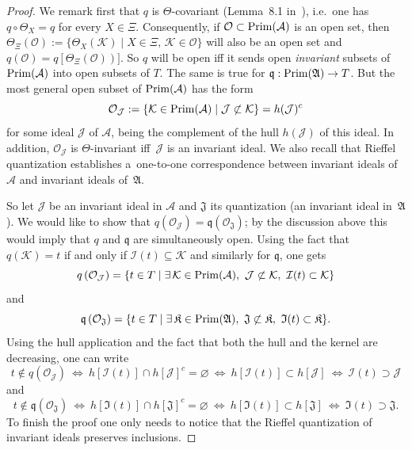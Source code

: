\documentclass[pdftex]{sigma}
\def\A{{\mathcal A}}
\def\Th{\Theta}
\def\AA{\mathfrak A}
\begin{document}
\begin{proof}
We remark f\/irst that $q$ is $\Th$-covariant (Lemma~8.1 in~\cite{Wi}), i.e.\ one has $q\circ\Th_X=q$ for every $X\in\Xi$.
Consequently, if $\mathcal O\subset {\rm Prim}(\A)$ is
an open set, then $\Th_\Xi(\mathcal O):=\{\Th_X(\mathcal K)\mid X\in\Xi, \, \mathcal K\in\mathcal O\}$ will also be an open set
and $q(\mathcal O)=q\left[\Th_\Xi(\mathcal O)\right)]$.
So $q$ will be open if\/f it sends open {\it invariant} subsets of ${\rm Prim}(\A)$
into open subsets of $T$. The same is true for $\mathfrak q:{\rm Prim}(\AA)\rightarrow T$. But the most general
open subset of ${\rm Prim}(\A)$ has the form
\[
\mathcal O_{\mathcal J}:=\{\mathcal K\in {\rm Prim}(\A)\mid \mathcal J\not\subset\mathcal K\}=h(\mathcal J)^c
\]
for some ideal $\mathcal J$ of $\A$, being the complement of the hull  $h(\mathcal J)$ of this ideal.
In addition, $\mathcal O_{\mathcal J}$ is $\Th$-invariant if\/f~$\mathcal J$ is an
invariant ideal. We also recall that Rief\/fel quantization establishes
a~one-to-one correspondence between invariant ideals of $\A$ and invariant ideals of~$\AA$.

So let $\mathcal J$ be an invariant ideal in $\A$ and $\mathfrak J$ its quantization
(an invariant ideal in~$\AA$). We would like to show that
$q\left(\mathcal O_\mathcal J\right)=\mathfrak q\left(\mathcal O_\mathfrak J\right)$;
by the discussion above this would imply that $q$ and $\mathfrak q$ are simultaneously open. Using the fact that
$q(\mathcal K)=t$ if and only if $\mathcal I(t)\subseteq \mathcal K$ and similarly for $\mathfrak q$, one gets
\[
q\left(\mathcal O_\mathcal J\right)=\{t\in T\mid \exists\,\mathcal K\in {\rm Prim}(\A),\ \mathcal J\not\subset\mathcal K,
\ \mathcal I(t)\subset\mathcal K\}
\]
and
\[
\mathfrak q\left(\mathcal O_\mathfrak J\right)=\{t\in T\mid \exists\,\mathfrak K\in {\rm Prim}(\AA),\
\mathfrak J\not\subset\mathfrak K,\ \mathfrak I(t)\subset\mathfrak K\}.
\]
Using the hull application  and the fact that both the hull and the kernel are decreasing, one can write
\[
t\notin q\left(\mathcal O_\mathcal J\right)\ \Longleftrightarrow\ h[\mathcal I(t)]\cap h[\mathcal J]^c=\varnothing
\ \Longleftrightarrow\ h[\mathcal I(t)]\subset h[\mathcal J]\ \Longleftrightarrow\ \mathcal I(t)\supset\mathcal J
\]
and
\[
t\notin \mathfrak q\left(\mathcal O_\mathfrak J\right)\ \Longleftrightarrow\ h[\mathfrak I(t)]\cap h[\mathfrak J]^c=\varnothing
\ \Longleftrightarrow\ h[\mathfrak I(t)]\subset h[\mathfrak J]\ \Longleftrightarrow\ \mathfrak I(t)\supset\mathfrak J.
\]
To f\/inish the proof one only needs to notice that the Rief\/fel quantization of invariant ideals preserves inclusions.
\end{proof}
\end{document}
